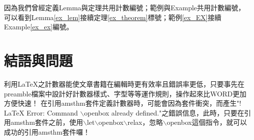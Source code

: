 	因為我們曾經定義Lemma與定理共用計數編號；範例與Example共用計數編號，可以看到Lemma\ref{ex_lem}接續定理\ref{ex_theorem}標號；範例\ref{ex_EX}接續Example\ref{ex_ex}編號。

\section{{\HC 結語與問題}}
	利用\LaTeX 之計數器能使文章書籍在編輯時更有效率且錯誤率更低，只要事先在preamble檔案中設計好計數器樣式、字型等等運作規則，操作起來比WORD更加方便快速！
	在引用amsthm套件定義計數器時，可能會因為套件衝突，而產生"! LaTeX Error: Command $\backslash$openbox already defined."之錯誤信息，此時，只要在引用amsthm套件之前，使用$\backslash$let$\backslash$openbox$\backslash$relax，忽略$\backslash$openbox這個指令，就可以成功的引用amsthm套件囉！


\nocite{*}






